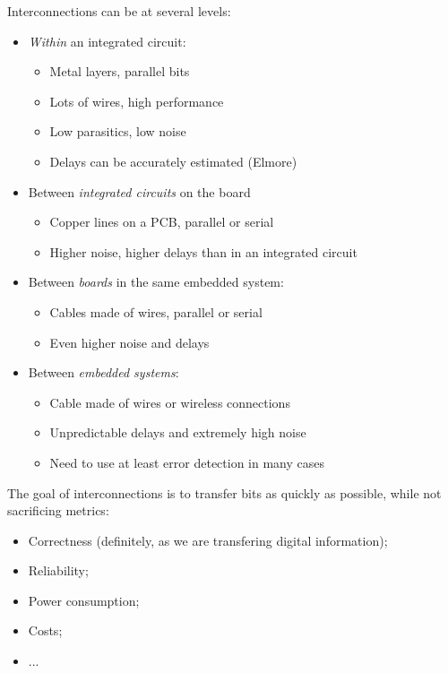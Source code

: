 \documentclass[a4paper,11pt]{article}
\begin{document}
Interconnections can be at several levels:
\begin{itemize}
	\item \textit{Within} an integrated circuit:
	      \begin{itemize}
		      \item Metal layers, parallel bits
		      \item Lots of wires, high performance
		      \item Low parasitics, low noise
		      \item Delays can be accurately estimated (Elmore)
	      \end{itemize}
	\item Between \textit{integrated circuits} on the board
	      \begin{itemize}
		      \item Copper lines on a PCB, parallel or serial
		      \item Higher noise, higher delays than in an integrated circuit
	      \end{itemize}
	\item Between \textit{boards} in the same embedded system:
	      \begin{itemize}
		      \item Cables made of wires, parallel or serial
		      \item Even higher noise and delays
	      \end{itemize}
	\item Between \textit{embedded systems}:
	      \begin{itemize}
		      \item Cable made of wires or wireless connections
		      \item Unpredictable delays and extremely high noise
		      \item Need to use at least error detection in many cases
	      \end{itemize}
\end{itemize}

The goal of interconnections is to transfer bits as quickly as possible, while not sacrificing metrics:
\begin{itemize}
	\item Correctness (definitely, as we are transfering digital information);
	\item Reliability;
	\item Power consumption;
	\item Costs;
	\item ...
\end{itemize}
\end{document}
